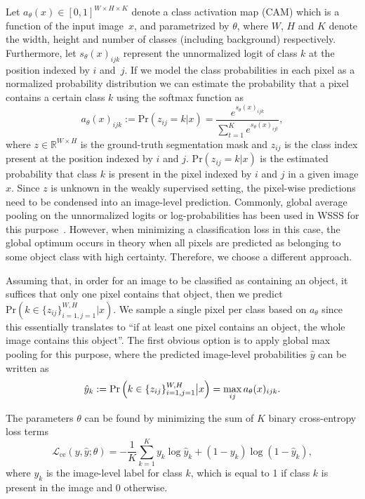 \documentclass{article}
\begin{document}
Let $a_\theta (x) \in [0, 1]^{W \times H \times K}$ denote a class activation map (CAM) which is a function of the input image~$x$, and parametrized by $\theta$, where $W$, $H$ and $K$ denote the width, height and number of classes (including background) respectively. Furthermore, let $s_\theta (x)_{ijk}$ represent the unnormalized logit of class $k$ at the position indexed by $i$ and~$j$. If we model the class probabilities in each pixel as a normalized probability distribution we can estimate the probability that a pixel contains a certain class $k$ using the softmax function as
\begin{equation}
	a_\theta (x)_{ijk} := \mathrm{Pr}(z_{ij} = k | x) = \frac{e^{s_\theta (x)_{ijk}}}{\sum_{t=1}^K e^{s_\theta (x)_{ijt}}},
\end{equation}
where $z \in \mathbb{R}^{W \times H}$ is the ground-truth segmentation mask and $z_{ij}$ is the class index present at the position indexed by $i$ and $j$. ${\mathrm{Pr}(z_{ij} = k | x)}$ is the estimated probability that class $k$ is present in the pixel indexed by $i$ and $j$ in a given image $x$. Since $z$ is unknown in the weakly supervised setting, the pixel-wise predictions need to be condensed into an image-level prediction. Commonly, global average pooling on the unnormalized logits or log-probabilities has been used in WSSS for this purpose~\cite{wang2020cvpr, ahn2018cvpr}. However, when minimizing a classification loss in this case, the global optimum occurs in theory when all pixels are predicted as belonging to some object class with high certainty. Therefore, we choose a different approach.

Assuming that, in order for an image to be classified as containing an object, it suffices that only one pixel contains that object, then we predict \mbox{$\mathrm{Pr} (k \in \{ z_{ij} \}_{i=1,j=1}^{W,H} | x)$}. We sample a single pixel per class based on $a_\theta$ since this essentially translates to ``if at least one pixel contains an object, the whole image contains this object''. The first obvious option is to apply global max pooling for this purpose, where the predicted image-level probabilities $\hat{y}$ can be written as
\begin{equation}
	\hat{y}_k := \mathrm{Pr} \left( k \in \{ z_{ij} \}_{i=1,j=1}^{W,H} \big{|} x \right) = \max_{ij} a_\theta (x)_{ijk}.
\end{equation}

The parameters $\theta$ can be found by minimizing the sum of $K$ binary cross-entropy loss terms
\begin{equation}
	\mathcal{L}_{\mathrm{ce}} (y, \hat{y}; \theta) = -\frac{1}{K} \sum_{k=1}^K y_k \log \hat{y}_k + (1 - y_k) \log (1 - \hat{y}_k),
\end{equation}
where $y_k$ is the image-level label for class $k$, which is equal to 1 if class $k$ is present in the image and 0 otherwise.
\end{document}

